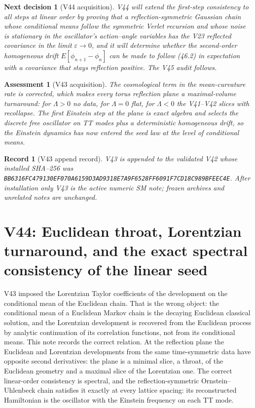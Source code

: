 \documentclass[11pt]{article}
\newtheorem{decision}[theorem]{Next decision}
\newtheorem{assessment}[theorem]{Assessment}
\newtheorem{record}[theorem]{Record}
\theoremstyle{remark}
\begin{document}
\begin{decision}[V44 acquisition]
\label{dec:v19v43-next}
V44 will extend the first-step consistency to all steps at linear order
by proving that a reflection-symmetric Gaussian chain whose conditional
means follow the symmetric Verlet recursion and whose noise is
stationary in the oscillator's action--angle variables has the V23
reflected covariance in the limit \(\varepsilon\to0\), and it will
determine whether the second-order homogeneous drift
\(E[\phi_{n+1}-\phi_n]\) can be made to follow (46.2) in expectation
with a covariance that stays reflection positive.  The V45 audit
follows.
\end{decision}

\begin{assessment}[V43 acquisition]
\label{ass:v19v43}
The cosmological term in the mean-curvature rate is corrected, which
makes every torus reflection plane a maximal-volume turnaround: for
\(\Lambda>0\) no data, for \(\Lambda=0\) flat, for \(\Lambda<0\) the
V41--V42 slices with recollapse.  The first Einstein step at the plane
is exact algebra and selects the discrete free oscillator on TT modes
plus a deterministic homogeneous drift, so the Einstein dynamics has now
entered the seed law at the level of conditional means.
\end{assessment}

\begin{record}[V43 append record]
\label{rec:v19v43}
V43 is appended to the validated V42 whose installed SHA--256 was
\texttt{BB6316FC479130EF070A6159D3AD9318E7A9F6528FF6091F7CD18C989BFEEC4E}.
After installation only V43 is the active numeric SM note; frozen
archives and unrelated notes are unchanged.
\end{record}


\section{V44: Euclidean throat, Lorentzian turnaround, and the exact spectral consistency of the linear seed}
\label{sec:v19v44}

V43 imposed the Lorentzian Taylor coefficients of the development on
the conditional mean of the Euclidean chain.  That is the wrong object:
the conditional mean of a Euclidean Markov chain is the decaying
Euclidean classical solution, and the Lorentzian development is
recovered from the Euclidean process by analytic continuation of its
correlation functions, not from its conditional means.  This note
records the correct relation.  At the reflection plane the Euclidean
and Lorentzian developments from the same time-symmetric data have
opposite second derivatives: the plane is a minimal slice, a throat, of
the Euclidean geometry and a maximal slice of the Lorentzian one.  The
correct linear-order consistency is spectral, and the reflection-symmetric
Ornstein--Uhlenbeck chain satisfies it exactly at every lattice
spacing: its reconstructed Hamiltonian is the oscillator with the
Einstein frequency on each TT mode.
\end{document}
